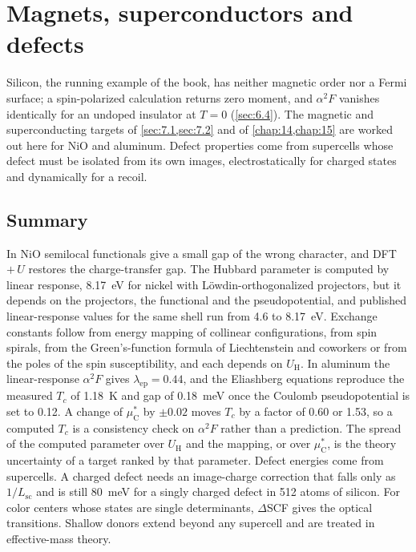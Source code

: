 \chapter{Magnets, superconductors and defects}\label{chap:28}

Silicon, the running example of the book, has neither magnetic order nor a Fermi surface; a spin-polarized calculation returns zero moment, and $\alpha^2F$ vanishes identically for an undoped insulator at $T = 0$ (\cref{sec:6.4}). The magnetic and superconducting targets of \cref{sec:7.1,sec:7.2} and of \cref{chap:14,chap:15} are worked out here for NiO and aluminum. Defect properties come from supercells whose defect must be isolated from its own images, electrostatically for charged states and dynamically for a recoil.




\section*{Summary}

In NiO semilocal functionals give a small gap of the wrong character, and DFT~$+\,U$ restores the charge-transfer gap. The Hubbard parameter is computed by linear response, \SI{8.17}{eV} for nickel with Löwdin-orthogonalized projectors, but it depends on the projectors, the functional and the pseudopotential, and published linear-response values for the same shell run from 4.6 to \SI{8.17}{eV}. Exchange constants follow from energy mapping of collinear configurations, from spin spirals, from the Green's-function formula of Liechtenstein and coworkers or from the poles of the spin susceptibility, and each depends on $U_{\mathrm{H}}$. In aluminum the linear-response $\alpha^2F$ gives $\lambda_{\mathrm{ep}} = 0.44$, and the Eliashberg equations reproduce the measured $T_c$ of \SI{1.18}{K} and gap of \SI{0.18}{meV} once the Coulomb pseudopotential is set to 0.12. A change of $\mu^*_{\mathrm{C}}$ by $\pm0.02$ moves $T_c$ by a factor of 0.60 or 1.53, so a computed $T_c$ is a consistency check on $\alpha^2F$ rather than a prediction. The spread of the computed parameter over $U_{\mathrm{H}}$ and the mapping, or over $\mu^*_{\mathrm{C}}$, is the theory uncertainty of a target ranked by that parameter. Defect energies come from supercells. A charged defect needs an image-charge correction that falls only as $1/L_{\mathrm{sc}}$ and is still \SI{80}{meV} for a singly charged defect in 512 atoms of silicon. For color centers whose states are single determinants, $\Delta$SCF gives the optical transitions. Shallow donors extend beyond any supercell and are treated in effective-mass theory.

\printbibliography[heading=subbibliography]
